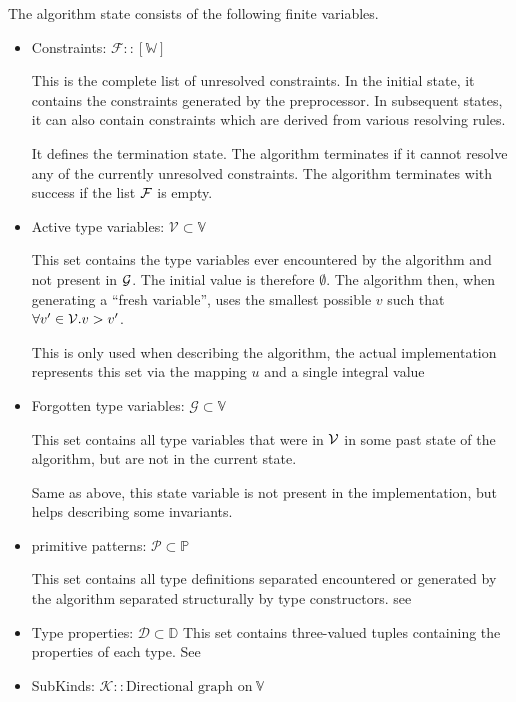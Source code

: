 \begin{defn}
    The algorithm state consists of the following finite variables. 
    \begin{itemize}
        \item Constraints: $\mathcal{F} :: [\mathbb{W}]$

        This is the complete list of unresolved constraints. In the initial state, it contains the constraints generated by the preprocessor. In subsequent states, it can also contain constraints which are derived from various resolving rules.

        It defines the termination state. The algorithm terminates if it cannot resolve any of the currently unresolved constraints. The algorithm terminates with success if the list $\mathcal F$ is empty.
        \item Active type variables: $\mathcal{V} \subset \mathbb{V}$
        
        This set contains the type variables ever encountered by the algorithm and not present in $\mathcal G$. The initial value is therefore $\emptyset$. The algorithm then, when generating a ``fresh variable'', uses the smallest possible $v$ such that $\forall v' \in \mathcal V. v > v'$.
        
        This is only used when describing the algorithm, the actual implementation represents this set via the mapping $u$ and a single integral value

        \item Forgotten type variables: $\mathcal{G} \subset \mathbb{V}$
        
        This set contains all type variables that were in $\mathcal V$ in some past state of the algorithm, but are not in the current state.
        
        Same as above, this state variable is not present in the implementation, but helps describing some invariants.
        \item primitive patterns: $\mathcal{P} \subset \mathbb{P}$
        
        This set contains all type definitions separated encountered or generated by the algorithm separated structurally by type constructors. see 
        \item Type properties: $\mathcal{D} \subset \mathbb{D}$
        This set contains three-valued tuples containing the properties of each type. See 
        \item SubKinds: $\mathcal{K} :: \text{Directional graph on}\ \mathbb{V}$
        

\end{itemize}
\end{defn}
